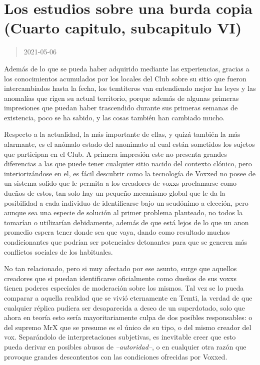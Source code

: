 \documentclass[
  spanish,
]{book}
\begin{document}
\hypertarget{los-estudios-sobre-una-burda-copia-cuarto-capitulo-subcapitulo-vi}{%
\section{Los estudios sobre una burda copia (Cuarto capitulo, subcapitulo VI)}\label{los-estudios-sobre-una-burda-copia-cuarto-capitulo-subcapitulo-vi}}

\begin{quote}
2021-05-06
\end{quote}

Además de lo que se pueda haber adquirido mediante las experiencias, gracias a los conocimientos acumulados por los locales del Club sobre su sitio que fueron intercambiados hasta la fecha, los temtiteros van entendiendo mejor las leyes y las anomalías que rigen su actual territorio, porque además de algunas primeras impresiones que puedan haber trascendido durante sus primeras semanas de existencia, poco se ha sabido, y las cosas también han cambiado mucho.

Respecto a la actualidad, la más importante de ellas, y quizá también la más alarmante, es el anómalo estado del anonimato al cual están sometidos los sujetos que participan en el Club. A primera impresión este no presenta grandes diferencias a las que puede tener cualquier sitio nacido del contexto clónico, pero interiorizándose en el, es fácil descubrir como la tecnología de Voxxed no posee de un sistema solido que le permita a los creadores de voxxs proclamarse como dueños de estos, tan solo hay un pequeño mecanismo global que le da la posibilidad a cada individuo de identificarse bajo un seudónimo a elección, pero aunque sea una especie de solución al primer problema planteado, no todos la tomarían o utilizarían debidamente, además de que está lejos de lo que un anon promedio espera tener donde sea que vaya, dando como resultado muchos condicionantes que podrían ser potenciales detonantes para que se generen más conflictos sociales de los habituales.

No tan relacionado, pero si muy afectado por ese asunto, surge que aquellos creadores que si puedan identificarse oficialmente como dueños de sus voxxs tienen poderes especiales de moderación sobre los mismos. Tal vez se lo pueda comparar a aquella realidad que se vivió eternamente en Temti, la verdad de que cualquier réplica pudiera ser desaparecida a deseo de un superdotado, solo que ahora en teoría esto sería mayoritariamente culpa de dos posibles responsables: o del supremo MrX que se presume es el único de su tipo, o del mismo creador del vox. Separándolo de interpretaciones subjetivas, es inevitable creer que esto pueda derivar en posibles abusos de \emph{--autoridad--}, o en cualquier otra razón que provoque grandes descontentos con las condiciones ofrecidas por Voxxed.
\end{document}
